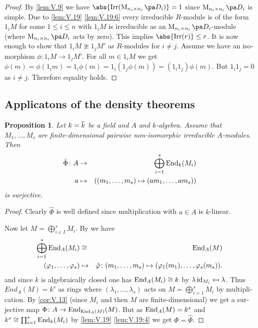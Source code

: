 \documentclass[12pt,a4paper]{scrartcl}
\theoremstyle{cplain}
\theoremstyle{cplain}
\theoremstyle{cplain}
\newtheorem{prop}[thmcounter]{Proposition}
\theoremstyle{definition}
\begin{document}
\begin{otherlanguage}{english}
\begin{proof}
  By \cref{lem:V.9} we have $\abs{\Irr(\Mat{n_i}{D_i})} = 1$ since $\Mat{n_i}{D_i}$ is simple. Due to \cref{lem:V.19} \ref{lem:V.19:6} every irreducible $R$-module is of the form $1_iM$ for some $1\le i\le n$ with $1_i M$ is irreducible as an $\Mat{n_i}{D_i}$-module (where $\Mat{n_i}{D_i}$ acts by zero). This implies $\abs{\Irr(r)} \le r$. It is now enough to show that $1_iM\ncong 1_jM'$ as $R$-modules for $i\neq j$. Assume we have an isomorphism $\phi\colon 1_iM \to 1_j M'$. For all $m\in 1_i M$ we get $\phi(m) = \phi(1_im) = 1_i \phi(m) = 1_i(1_j \phi(m)) = (1_i1_j) \phi(m)$. But $1_i1_j = 0$ as $i \neq j$. Therefore equality holds.
\end{proof}

\subsection{Applicatons of the density theorems}

\begin{prop} \label{prop:V.21} %
  Let $k=\overline k$ be a field and $A$ and $k$-algebra. Assume that $M_1,\ldots,M_s$ are finite-dimensional pairwise non-isomorphic irreducible $A$-modules. Then
  \begin{eqnarray*}
    \hat\Phi\colon A &\to& \bigoplus_{i=1}^s \operatorname{End}_k(M_i) \\
    a &\mapsto& ((m_1,\ldots,m_s) \mapsto (am_1,\ldots,am_s))
  \end{eqnarray*}
  is surjective.
\end{prop}
\begin{proof}
  Clearly $\hat\Phi$ is well defined since multiplication with $a \in A$ is $k$-linear.
  
  Now let $M=\bigoplus_{i\in I}^s M_i$. By  we have
  \begin{eqnarray*}
    \bigoplus_{i=1}^s\operatorname{End}_A(M_i) &\cong& \operatorname{End}_A(M) \\
    (\varphi_1,\ldots,\varphi_s) &\mapsto& \hat{\varphi} \colon (m_1,\ldots,m_s) \mapsto (\varphi_1(m_1),\ldots,\varphi_s(m_s)).
  \end{eqnarray*}
  and since $k$ is algebraically closed one has $\operatorname{End}_A(M_i) \cong k$ by $\lambda\operatorname{id}_{M_i} \mapsfrom \lambda$. Thus $End_A(M) = k^s $ as rings where $(\lambda_1,\ldots,\lambda_s)$ acts on $M=\bigoplus_{i=1}^sM_i$ by multiplication. By \cref{cor:V.13} (since $M_i$ and then $M$ are finite-dimensional) we get a surjective map $\Phi\colon A \to \operatorname{End}_{\operatorname{End}_{A}(M)}(M)$. But as $\operatorname{End}_A(M) = k^s$ and $k^s \cong \prod_{i=1}^s \operatorname{End}_{k}(M_i)$ by \cref{lem:V.19} \ref{lem:V.19:4} we get $\Phi=\hat\Phi$.
\end{proof}


\end{otherlanguage}
\end{document}
